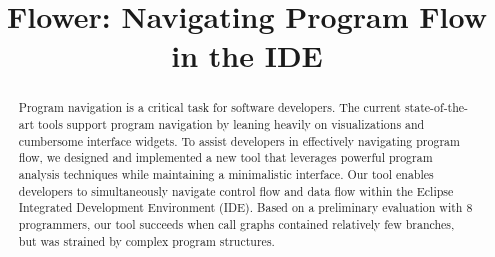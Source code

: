 \documentclass[conference]{IEEEtran}
\begin{document}
%
\title{Flower: Navigating Program Flow in the IDE}


\author{
}

\maketitle

\begin{abstract}
Program navigation is a critical task for software developers. 
The current state-of-the-art tools support program navigation by leaning heavily on visualizations and cumbersome interface widgets.
To assist developers in effectively navigating program flow, we designed and implemented a new tool that leverages powerful program analysis techniques while maintaining a minimalistic interface.
Our tool enables developers to simultaneously navigate control flow and data flow within the Eclipse Integrated Development Environment (IDE).
Based on a preliminary evaluation with 8 programmers, our tool succeeds when call graphs contained relatively few branches, but was strained by complex program structures. 
\end{abstract}
\end{document}
